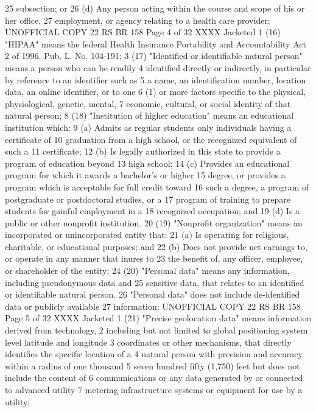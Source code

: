 25 subsection; or
26 (d) Any person acting within the course and scope of his or her office,
27 employment, or agency relating to a health care provider;
UNOFFICIAL COPY 22 RS BR 158
Page 4 of 32
XXXX Jacketed
1 (16) "HIPAA" means the federal Health Insurance Portability and Accountability Act
2 of 1996, Pub. L. No. 104-191;
3 (17) "Identified or identifiable natural person" means a person who can be readily
4 identified directly or indirectly, in particular by reference to an identifier such as
5 a name, an identification number, location data, an online identifier, or to one
6 (1) or more factors specific to the physical, physiological, genetic, mental,
7 economic, cultural, or social identity of that natural person;
8 (18) "Institution of higher education" means an educational institution which:
9 (a) Admits as regular students only individuals having a certificate of
10 graduation from a high school, or the recognized equivalent of such a
11 certificate;
12 (b) Is legally authorized in this state to provide a program of education beyond
13 high school;
14 (c) Provides an educational program for which it awards a bachelor's or higher
15 degree, or provides a program which is acceptable for full credit toward
16 such a degree, a program of postgraduate or postdoctoral studies, or a
17 program of training to prepare students for gainful employment in a
18 recognized occupation; and
19 (d) Is a public or other nonprofit institution.
20 (19) "Nonprofit organization" means an incorporated or unincorporated entity that:
21 (a) Is operating for religious, charitable, or educational purposes; and
22 (b) Does not provide net earnings to, or operate in any manner that inures to
23 the benefit of, any officer, employee, or shareholder of the entity;
24 (20) "Personal data" means any information, including pseudonymous data and
25 sensitive data, that relates to an identified or identifiable natural person.
26 "Personal data" does not include de-identified data or publicly available
27 information;
UNOFFICIAL COPY 22 RS BR 158
Page 5 of 32
XXXX Jacketed
1 (21) "Precise geolocation data" means information derived from technology,
2 including but not limited to global positioning system level latitude and longitude
3 coordinates or other mechanisms, that directly identifies the specific location of a
4 natural person with precision and accuracy within a radius of one thousand
5 seven hundred fifty (1,750) feet but does not include the content of
6 communications or any data generated by or connected to advanced utility
7 metering infrastructure systems or equipment for use by a utility;
